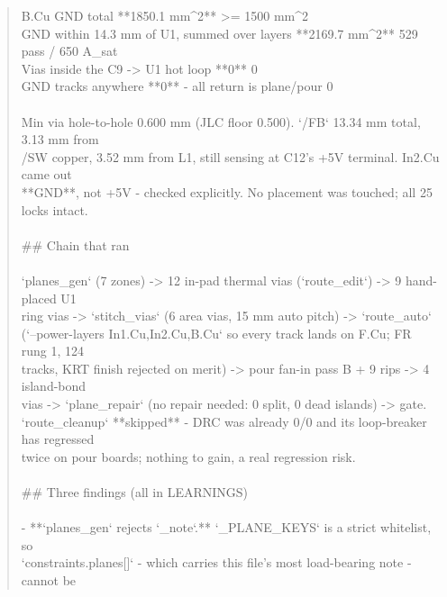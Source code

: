 \documentclass[11pt,a4paper]{article}
\begin{document}
\begin{quote}
\textbar{} B.Cu GND total \textbar{} {*}{*}1850.1 mm\textasciicircum{}2{*}{*} \textbar{} \textgreater{}= 1500 mm\textasciicircum{}2 \textbar{}\\
\textbar{} GND within 14.3 mm of U1, summed over layers \textbar{} {*}{*}2169.7 mm\textasciicircum{}2{*}{*} \textbar{} 529 pass / 650 A\_sat \textbar{}\\
\textbar{} Vias inside the C9 -\textgreater{} U1 hot loop \textbar{} {*}{*}0{*}{*} \textbar{} 0 \textbar{}\\
\textbar{} GND tracks anywhere \textbar{} {*}{*}0{*}{*} - all return is plane/pour \textbar{} 0 \textbar{}\\
~\\
Min via hole-to-hole 0.600 mm (JLC floor 0.500). `/FB` 13.34 mm total, 3.13 mm from\\
/SW copper, 3.52 mm from L1, still sensing at C12's +5V terminal. In2.Cu came out\\
{*}{*}GND{*}{*}, not +5V - checked explicitly. No placement was touched; all 25 locks intact.\\
~\\
\#\# Chain that ran\\
~\\
`planes\_gen` (7 zones) -\textgreater{} 12 in-pad thermal vias (`route\_edit`) -\textgreater{} 9 hand-placed U1\\
ring vias -\textgreater{} `stitch\_vias` (6 area vias, 15 mm auto pitch) -\textgreater{} `route\_auto`\\
(`--power-layers In1.Cu,In2.Cu,B.Cu` so every track lands on F.Cu; FR rung 1, 124\\
tracks, KRT finish rejected on merit) -\textgreater{} pour fan-in pass B + 9 rips -\textgreater{} 4 island-bond\\
vias -\textgreater{} `plane\_repair` (no repair needed: 0 split, 0 dead islands) -\textgreater{} gate.\\
`route\_cleanup` {*}{*}skipped{*}{*} - DRC was already 0/0 and its loop-breaker has regressed\\
twice on pour boards; nothing to gain, a real regression risk.\\
~\\
\#\# Three findings (all in LEARNINGS)\\
~\\
- {*}{*}`planes\_gen` rejects `\_note`.{*}{*} `\_PLANE\_KEYS` is a strict whitelist, so\\
  `constraints.planes{[}{]}` - which carries this file's most load-bearing note - cannot be\\

\end{quote}
\end{document}
